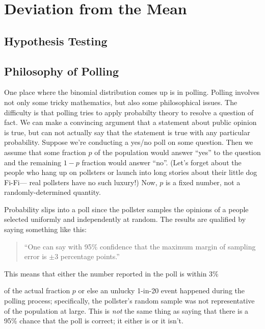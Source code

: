 \chapter{Deviation from the Mean}



\section{Hypothesis Testing}



\iffalse
\section{Philosophy of Polling}

One place where the binomial distribution comes up is in polling.
Polling involves not only some tricky mathematics, but also some
philosophical issues.
The difficulty is that polling tries to apply probabilty theory to
resolve a question of fact.  We can make a
convincing argument that a statement about public opinion is true, but
can not actually say that the statement is true with any particular
probability.  Suppose we're conducting a yes/no poll on some question.
Then we assume that some fraction $p$ of the population would answer
``yes'' to the question and the remaining $1 - p$ fraction would
answer ``no''.  (Let's forget about the people who hang up on
pollsters or launch into long stories about their little dog Fi-Fi---
real pollsters have no such luxury!)  Now, $p$ is a fixed number, not
a randomly-determined quantity.  

Probability slips into a poll since the pollster samples the opinions
of a people selected uniformly and independently at random.  The
results are qualified by saying something like this:
%
\begin{quotation}
``One can say with 95\% confidence that the maximum margin of sampling
error is $\pm 3$ percentage points.''
\end{quotation}
%
This means that either the number reported in the poll is within 3\%

of the actual fraction $p$ or else an unlucky 1-in-20 event happened
during the polling process; specifically, the pollster's random sample
was not representative of the population at large.  This is
\textit{not} the same thing as saying that there is a 95\% chance that
the poll is correct; it either is or it isn't. 


